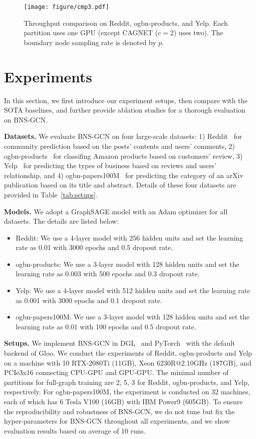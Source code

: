 \documentclass{article}
\newcommand{\niparagraph}[1]{\noindent\textbf{#1}}
\begin{document}
\begin{figure*}
  \centering
  \texttt{[image: figure/cmp3.pdf]}
  \caption{Throughput comparison on Reddit, ogbn-products, and Yelp. Each partition uses one GPU (except CAGNET ($c=2$) uses two). The boundary node sampling rate is denoted by $p$.}
  \label{fig:cmp}
\end{figure*}


\section{Experiments}
\label{sec:experiment}  

In this section, we first introduce our experiment setups, then compare with the SOTA baselines, and further provide ablation studies for a thorough evaluation on BNS-GCN.


\niparagraph{Datasets.} We evaluate BNS-GCN on four large-scale datasets:
1) Reddit~\citep{hamilton2017inductive} for community prediction based on the posts' contents and users' comments,
2) ogbn-products~\citep{hu2020open} for classifing Amazon products based on customers' review,
3) Yelp~\citep{zeng2019graphsaint} for predicting the types of business based on reviews and users' relationship,
and 4) ogbn-papers100M~\citep{hu2020open} for predicting the category of an arXiv publication based on its title and abstract.
Details of these four datasets are provided in Table~\ref{tab:setups}.


\niparagraph{Models.}
\label{sec:model}
We adopt a GraphSAGE model with an Adam optimizer for all datasets. The details are listed below:
\begin{itemize}
    \item Reddit: We use a 4-layer model with 256 hidden units and set the learning rate as 0.01 with 3000 epochs and 0.5 dropout rate.
    \item ogbn-products: We use a 3-layer model with 128 hidden units and set the learning rate as 0.003 with 500 epochs and 0.3 dropout rate.
    \item Yelp: We use a 4-layer model with 512 hidden units and set the learning rate as 0.001 with 3000 epochs and 0.1 dropout rate.
    \item ogbn-papers100M: We use a 3-layer model with 128 hidden units and set the learning rate as 0.01 with 100 epochs and 0.5 dropout rate.
\end{itemize}


\niparagraph{Setups.} 
We implement BNS-GCN in DGL~\citep{wang2019dgl} and PyTorch~\citep{paszke2019pytorch} with the default backend of Gloo. 
We conduct the experiments of Reddit,  ogbn-products and Yelp on a machine with 10 RTX-2080Ti (11GB), Xeon 6230R@2.10GHz (187GB), and PCIe3x16 connecting CPU-GPU and GPU-GPU. 
The minimal number of partitions for full-graph training are 2, 5, 3 for Reddit, ogbn-products, and Yelp, respectively. 
For ogbn-papers100M, the experiment is conducted on 32 machines, each of which has 6 Tesla V100 (16GB) with IBM Power9 (605GB).
To ensure the reproducibility and robustness of BNS-GCN, we do not tune but fix the hyper-parameters for BNS-GCN throughout all experiments, and we show evaluation results based on average of 10 runs.
\end{document}
